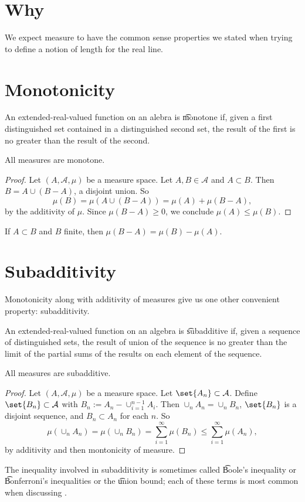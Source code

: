 

\section*{Why}

We expect measure to have the common sense properties we stated when trying to define a notion of length for the real line.

\section*{Monotonicity}

An extended-real-valued function on an alebra is \t{monotone} if, given a first distinguished set contained in a distinguished second set, the result of the first is no greater than the result of the second.

\begin{proposition}
All measures are monotone.\end{proposition}
\begin{proof}Let $(A, \mathcal{A} , \mu )$ be a measure space.
Let $A, B \in \mathcal{A} $ and $A \subset B$.
Then $B = A \cup (B - A)$, a disjoint union.
So
  \[
\mu (B) = \mu (A \cup (B - A))= \mu (A) + \mu (B - A),
  \]
by the additivity of $\mu $.
Since $\mu (B - A) \geq 0$,
we conclude $\mu (A) \leq \mu (B)$.\end{proof}
\begin{proposition}
If $A \subset B$ and $B$ finite, then $\mu (B - A) = \mu (B) - \mu (A)$.\end{proposition}
\section*{Subadditivity}

Monotonicity along with additivity of measures give us one other convenient property: subadditivity.

An extended-real-valued function on an algebra is \t{subadditive} if, given a sequence of distinguished sets, the result of union of the sequence is no greater than the limit of the partial sums of the results on each element of the sequence.

\begin{proposition}
All measures are subadditive.\end{proposition}
\begin{proof}Let $(A, \mathcal{A} , \mu )$ be a measure space.
Let $\set{A_n} \subset \mathcal{A} $.
Define $\set{B_n} \subset \mathcal{A} $ with $B_n := A_n - \cup_{i = 1}^{n-1} A_i$.
Then $\cup_n A_n = \cup_n B_n$, $\set{B_n}$ is a disjoint sequence, and $B_n \subset A_n$ for each $n$.
So
    \[
\mu (\cup_{n} A_n) = \mu (\cup_{n} B_n) = \sum_{i = 1}^{\infty} \mu (B_n) \leq \sum_{i = 1}^{\infty} \mu (A_n),
    \]
by additivity and then montonicity of measure.
\end{proof}
The inequality involved in subadditivity is sometimes called \t{Boole's inequality} or \t{Bonferroni's inequalities} or the \t{union bound}; each of these terms is most common when discussing .

